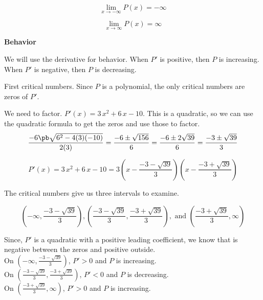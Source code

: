 \documentclass{ximera}
\begin{document}
\[
\lim\limits_{x \to -\infty} P(x) = -\infty 
\]




\[
\lim\limits_{x \to \infty} P(x) = \infty 
\]


















\textbf{Behavior}

We will use the derivative for behavior. When $P'$ is positive, then $P$ is increasing.  When $P'$ is negative, then $P$ is decreasing.  


First critical numbers.  Since $P$ is a polynomial, the only critical numbers are zeros of $P'$.  


We need to factor. $P'(x) = 3 \, x^2 + 6 \, x - 10$.  This is a quadratic, so we can use the quadratic formula to get  the zeros and use those to factor. \\


\[
\frac{-6 \pb \sqrt{6^2 - 4 (3)(-10)}}{2(3)} = \frac{-6 \pm \sqrt{156}}{6} = \frac{-6 \pm 2\sqrt{39}}{6} = \frac{-3 \pm \sqrt{39}}{3}
\]




\[
P'(x) = 3 \, x^2 + 6 \, x - 10 = 3 \left( x - \frac{-3 - \sqrt{39}}{3} \right) \left( x - \frac{-3 + \sqrt{39}}{3}  \right)
\]



The critical numbers give us three intervals to examine.

\[
\left( -\infty, \frac{-3 - \sqrt{39}}{3} \right), \left( \frac{-3 - \sqrt{39}}{3}, \frac{-3 + \sqrt{39}}{3} \right), \text{ and } \left( \frac{-3 + \sqrt{39}}{3}, \infty \right)
\]


Since, $P'$ is a quadratic with a positive leading coefficient, we know that is negative between the zeros and positive outside. \\



On $\left( -\infty, \frac{-3 - \sqrt{39}}{3} \right)$, $P' > 0$ and $P$ is increasing. \\


On $\left( \frac{-3 - \sqrt{39}}{3}, \frac{-3 + \sqrt{39}}{3} \right)$, $P' < 0$ and $P$ is decreasing. \\


On $\left( \frac{-3 + \sqrt{39}}{3}, \infty \right)$, $P' > 0$ and $P$ is increasing. \\
\end{document}
